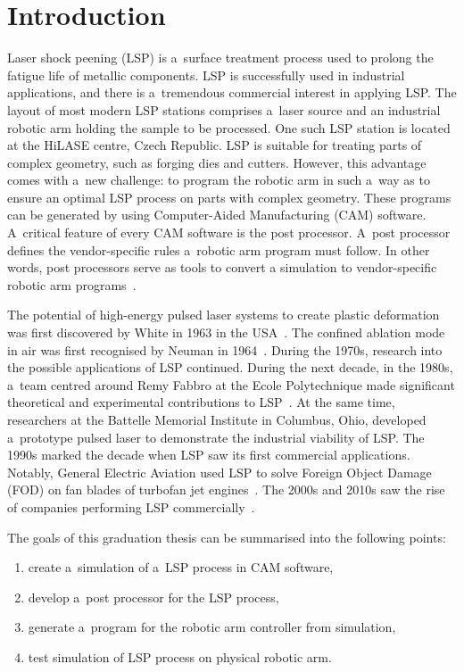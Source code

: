 \chapter{Introduction \label{ch:uvod}}




Laser shock peening (LSP) is a~surface treatment process used to prolong the fatigue life of metallic components. LSP is successfully used in industrial applications, and there is a~tremendous commercial interest in applying LSP. The layout of most modern LSP stations comprises a~laser source and an industrial robotic arm holding the sample to be processed. One such LSP station is located at the HiLASE centre, Czech Republic. LSP is suitable for treating parts of complex geometry, such as forging dies and cutters. However, this advantage comes with a~new challenge: to program the robotic arm in such a~way as to ensure an optimal LSP process on parts with complex geometry. These programs can be generated by using Computer-Aided Manufacturing (CAM) software. A~critical feature of every CAM software is the post processor. A~post processor defines the vendor-specific rules a~robotic arm program must follow.  In other words, post processors serve as tools to convert a simulation to vendor-specific robotic arm programs~\cite{ding_ye_2006}.

The potential of high-energy pulsed laser systems to create plastic deformation was first discovered by White in 1963 in the USA~\cite{white_1963}. The confined ablation mode in air was first recognised by Neuman in 1964~\cite{neuman_1964}. During the 1970s, research into the possible applications of LSP continued. During the next decade, in the 1980s, a~team centred around Remy Fabbro at the Ecole Polytechnique made significant theoretical and experimental contributions to LSP~\cite{fabbro_fournier_ballard_devaux_virmont_1990}. At the same time, researchers at the Battelle Memorial Institute in Columbus, Ohio, developed a~prototype pulsed laser to demonstrate the industrial viability of LSP. The 1990s marked the decade when LSP saw its first commercial applications. Notably, General Electric Aviation used LSP to solve Foreign Object Damage (FOD) on fan blades of turbofan jet engines~\cite{airforce}. The 2000s and 2010s saw the rise of companies performing LSP commercially~\cite{sano}.

The goals of this graduation thesis can be summarised into the following points:
\begin{enumerate}

    \item create a~simulation of a~LSP process in CAM software,
    \item develop a~post processor for the LSP process, 
    \item generate a~program  for the robotic arm controller from simulation,
    \item test simulation of LSP process on physical robotic arm.

    
\end{enumerate}

